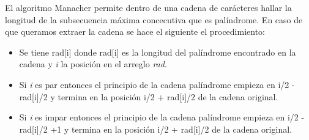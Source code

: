 El algoritmo Manacher permite dentro de una cadena de carácteres hallar la longitud de la subsecuencia máxima concecutiva que es palíndrome. En caso de que queramos extraer la cadena se hace el siguiente el procedimiento:

\begin{itemize}
	\item Se tiene rad[i] donde rad[i] es la longitud del palíndrome encontrado en la cadena y {\em i} la posición en el arreglo {\em rad}.
	
	\item Si {\em i} es par entonces el principio de la cadena palíndrome empieza en i/2 - rad[i]/2 y termina en la posición i/2 + rad[i]/2 de la cadena original.
	
	\item Si {\em i} es impar entonces el principio de la cadena palíndrome empieza en i/2 - rad[i]/2 +1 y termina en la posición i/2 + rad[i]/2 de la cadena original.
\end{itemize}